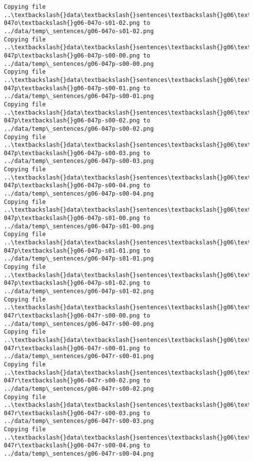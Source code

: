 \documentclass[11pt]{article}
\begin{document}
\begin{Verbatim}[commandchars=\\\{\}]
Copying file ..\textbackslash{}data\textbackslash{}sentences\textbackslash{}g06\textbackslash{}g06-047o\textbackslash{}g06-047o-s01-02.png to
../data/temp\_sentences/g06-047o-s01-02.png
Copying file ..\textbackslash{}data\textbackslash{}sentences\textbackslash{}g06\textbackslash{}g06-047p\textbackslash{}g06-047p-s00-00.png to
../data/temp\_sentences/g06-047p-s00-00.png
Copying file ..\textbackslash{}data\textbackslash{}sentences\textbackslash{}g06\textbackslash{}g06-047p\textbackslash{}g06-047p-s00-01.png to
../data/temp\_sentences/g06-047p-s00-01.png
Copying file ..\textbackslash{}data\textbackslash{}sentences\textbackslash{}g06\textbackslash{}g06-047p\textbackslash{}g06-047p-s00-02.png to
../data/temp\_sentences/g06-047p-s00-02.png
Copying file ..\textbackslash{}data\textbackslash{}sentences\textbackslash{}g06\textbackslash{}g06-047p\textbackslash{}g06-047p-s00-03.png to
../data/temp\_sentences/g06-047p-s00-03.png
Copying file ..\textbackslash{}data\textbackslash{}sentences\textbackslash{}g06\textbackslash{}g06-047p\textbackslash{}g06-047p-s00-04.png to
../data/temp\_sentences/g06-047p-s00-04.png
Copying file ..\textbackslash{}data\textbackslash{}sentences\textbackslash{}g06\textbackslash{}g06-047p\textbackslash{}g06-047p-s01-00.png to
../data/temp\_sentences/g06-047p-s01-00.png
Copying file ..\textbackslash{}data\textbackslash{}sentences\textbackslash{}g06\textbackslash{}g06-047p\textbackslash{}g06-047p-s01-01.png to
../data/temp\_sentences/g06-047p-s01-01.png
Copying file ..\textbackslash{}data\textbackslash{}sentences\textbackslash{}g06\textbackslash{}g06-047p\textbackslash{}g06-047p-s01-02.png to
../data/temp\_sentences/g06-047p-s01-02.png
Copying file ..\textbackslash{}data\textbackslash{}sentences\textbackslash{}g06\textbackslash{}g06-047r\textbackslash{}g06-047r-s00-00.png to
../data/temp\_sentences/g06-047r-s00-00.png
Copying file ..\textbackslash{}data\textbackslash{}sentences\textbackslash{}g06\textbackslash{}g06-047r\textbackslash{}g06-047r-s00-01.png to
../data/temp\_sentences/g06-047r-s00-01.png
Copying file ..\textbackslash{}data\textbackslash{}sentences\textbackslash{}g06\textbackslash{}g06-047r\textbackslash{}g06-047r-s00-02.png to
../data/temp\_sentences/g06-047r-s00-02.png
Copying file ..\textbackslash{}data\textbackslash{}sentences\textbackslash{}g06\textbackslash{}g06-047r\textbackslash{}g06-047r-s00-03.png to
../data/temp\_sentences/g06-047r-s00-03.png
Copying file ..\textbackslash{}data\textbackslash{}sentences\textbackslash{}g06\textbackslash{}g06-047r\textbackslash{}g06-047r-s00-04.png to
../data/temp\_sentences/g06-047r-s00-04.png

\end{Verbatim}
\end{document}
